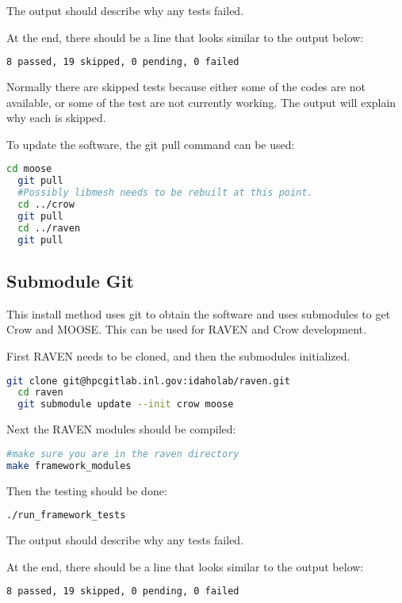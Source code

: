 The output should describe why any tests failed.

At the end, there should be a line that looks similar to the output below:
\begin{lstlisting}[language=bash]
8 passed, 19 skipped, 0 pending, 0 failed
\end{lstlisting}

Normally there are skipped tests because either some of the codes are
not available, or some of the test are not currently working.  The
output will explain why each is skipped.

To update the software, the git pull command can be used:

\begin{lstlisting}[language=bash]
  cd moose
  git pull
  #Possibly libmesh needs to be rebuilt at this point.
  cd ../crow
  git pull
  cd ../raven
  git pull
\end{lstlisting}

\subsection{Submodule Git}

This install method uses git to obtain the software and uses
submodules to get Crow and MOOSE.  This can be used for RAVEN and Crow
development.

First RAVEN needs to be cloned, and then the submodules initialized.

\begin{lstlisting}[language=bash]
  git clone git@hpcgitlab.inl.gov:idaholab/raven.git
  cd raven
  git submodule update --init crow moose
\end{lstlisting}

Next the RAVEN modules should be compiled:

\begin{lstlisting}[language=bash]
#make sure you are in the raven directory
make framework_modules
\end{lstlisting}

Then the testing should be done:

\begin{lstlisting}[language=bash]
  ./run_framework_tests
\end{lstlisting}

The output should describe why any tests failed.

At the end, there should be a line that looks similar to the output below:
\begin{lstlisting}[language=bash]
8 passed, 19 skipped, 0 pending, 0 failed
\end{lstlisting}

